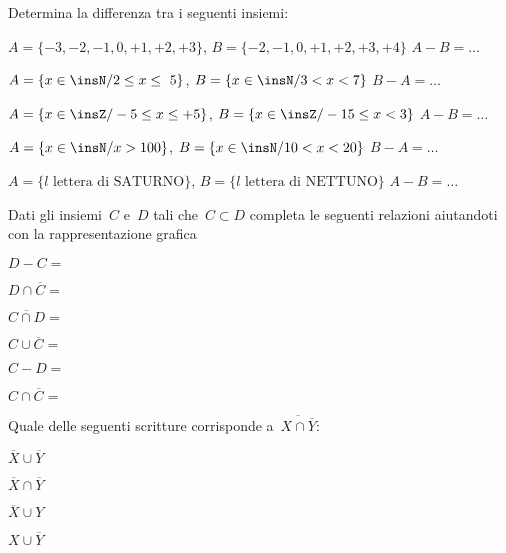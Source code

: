 \begin{esercizio}
\label{ese:7.54}
Determina la differenza tra i seguenti insiemi:
\vspace{-6pt}
\begin{enumeratea}
 \item $A=\{-3,-2,-1,0,+1,+2,+3\}$, $B=\{-2,-1,0,+1,+2,+3,+4\}$ $A-B=\ldots$
\item $A=\{x\in\insN/2\le x\le~5\}$, $B=\{x\in\insN/3<x<7\}$ $B-A=\ldots$
\item $A=\{x\in\insZ/-5\le x\le +5\}$, $B=\{x\in\insZ/-15\le x<3\}$ $A-B=\ldots$
\item $A=\{x\in\insN/x>100\}$, $B=\{x\in \insN/10<x<20\}$ $B-A=\ldots$
\item $A=\{l\text{ lettera di SATURNO}\}$, $B=\{l\text{ lettera di NETTUNO}\}$ 
$A-B=\ldots$
\end{enumeratea}
\end{esercizio}

\begin{esercizio}
\label{ese:7.55}
Dati gli insiemi~$C$ e~$D$ tali che~$C\subset D$
completa le seguenti relazioni aiutandoti con la rappresentazione
grafica
\vspace{-6pt}
\begin{multicols}{3}
\begin{enumeratea}
\item $D-C=$
\item $D\cap \overline{C}=$
\item $\overline{{C\cap D}}=$
\item $C\cup \overline{C}=$
\item $C-D=$
\item $C\cap \overline{C}=$
\end{enumeratea}
\end{multicols}
\end{esercizio}

\begin{esercizio}
\label{ese:7.56}
Quale delle seguenti scritture corrisponde a~$\overline{{X\cap \overline{Y}}}$:
\vspace{-6pt}
\begin{multicols}{4}
 \begin{enumeratea}
 \item $\overline{X}\cup \overline{Y}$
 \item $\overline{X}\cap \overline{Y}$
 \item $\overline{X}\cup Y$
 \item $X\cup \overline{Y}$
 \end{enumeratea}
\end{multicols}
\end{esercizio}


